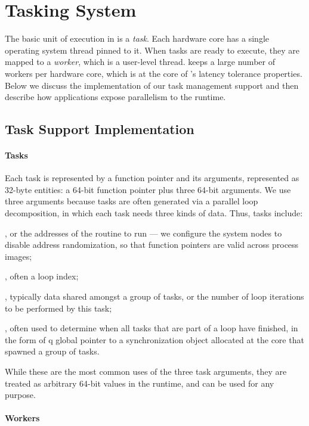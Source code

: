\section{Tasking System}

The basic unit of execution in \Grappa is a {\em task}. Each hardware core has
a single operating system thread pinned to it. When tasks are ready to
execute, they are mapped to a {\em worker}, which is a user-level thread.
\Grappa keeps a large number of workers per hardware core, which is at the
core of \Grappa's latency tolerance properties. Below we discuss the
implementation of our task management support and then describe how
applications expose parallelism to the \Grappa runtime.

\subsection{Task Support Implementation}

\paragraph{Tasks}
Each task is represented by a function pointer and its arguments, represented
as 32-byte entities: a 64-bit function pointer plus three 64-bit arguments. We
use three arguments because tasks are often generated via a parallel loop
decomposition, in which each task needs three kinds of data. Thus, tasks
include:

, or the addresses of the routine to run ---
we configure the system nodes to disable address randomization, so that
function pointers are valid across process images;

, often a loop index; 

, typically data shared amongst a group of
tasks, or the number of loop iterations to be performed by this task;

, often used to determine when all
tasks that are part of a loop have finished, in the form of q global pointer
to a synchronization object allocated at the core that spawned a group of
tasks.

While these are the most common uses of the three task arguments, they are
treated as arbitrary 64-bit values in the runtime, and can be used for any
purpose.

\paragraph{Workers}

